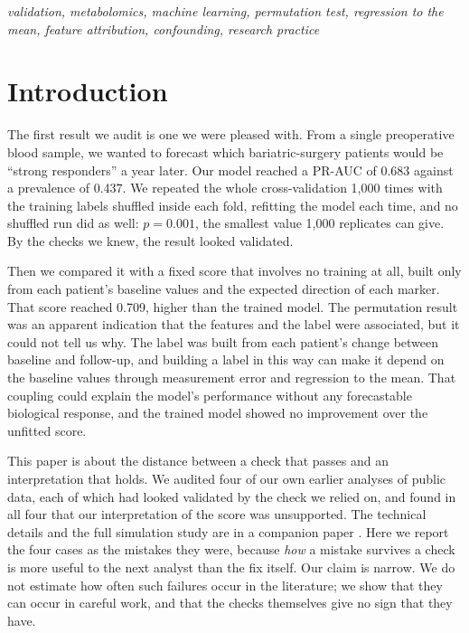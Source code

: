 \documentclass[conference]{IEEEtran}
\begin{document}
\begin{IEEEkeywords}
\itshape validation, metabolomics, machine learning, permutation test, regression to
the mean, feature attribution, confounding, research practice
\end{IEEEkeywords}

\section{Introduction}
\label{sec:intro}

The first result we audit is one we were pleased with. From a single
preoperative blood sample, we wanted to forecast which bariatric-surgery
patients would be ``strong responders'' a year later. Our model reached a
PR-AUC of 0.683 against a prevalence of 0.437. We repeated the whole
cross-validation 1{,}000 times with the training labels shuffled inside each
fold, refitting the model each time, and no shuffled run did as well:
$p=0.001$, the smallest value 1{,}000 replicates can give. By the checks we
knew, the result looked validated.

Then we compared it with a fixed score that involves no training at all,
built only from each patient's baseline values and the expected direction of
each marker. That score reached 0.709, higher than the trained model. The
permutation result was an apparent indication that the features and the
label were associated, but it could not tell us why. The label was built
from each patient's change between baseline and follow-up, and building a
label in this way can make it depend on the baseline values through
measurement error and regression to the mean. That coupling could explain
the model's performance without any forecastable biological response, and
the trained model showed no improvement over the unfitted score.

This paper is about the distance between a check that passes and an
interpretation that holds. We audited four of our own earlier analyses of
public data, each of which had
looked validated by the check we relied on, and found in all four that our
interpretation of the score was unsupported. The technical details and the
full simulation study are in a companion paper \cite{vyw}. Here we report
the four cases as the mistakes they were, because \emph{how} a mistake
survives a check is more useful to the next analyst than the fix itself. Our
claim is narrow. We do not estimate how often such failures occur in the
literature; we show that they can occur in careful work, and that the checks
themselves give no sign that they have.
\end{document}
